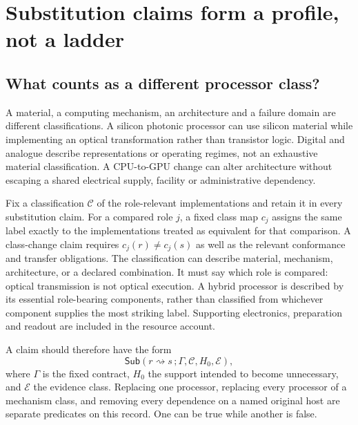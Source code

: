 \section{Substitution claims form a profile, not a ladder}\label{sec:substitution}
\subsection{What counts as a different processor class?}
A material, a computing mechanism, an architecture and a failure domain are different classifications. A silicon photonic processor can use silicon material while implementing an optical transformation rather than transistor logic. Digital and analogue describe representations or operating regimes, not an exhaustive material classification. A CPU-to-GPU change can alter architecture without escaping a shared electrical supply, facility or administrative dependency.

Fix a classification $\mathcal C$ of the role-relevant implementations and retain it in every substitution claim. For a compared role $j$, a fixed class map $c_j$ assigns the same label exactly to the implementations treated as equivalent for that comparison. A class-change claim requires $c_j(r)\ne c_j(s)$ as well as the relevant conformance and transfer obligations. The classification can describe material, mechanism, architecture, or a declared combination. It must say which role is compared: optical transmission is not optical execution. A hybrid processor is described by its essential role-bearing components, rather than classified from whichever component supplies the most striking label. Supporting electronics, preparation and readout are included in the resource account.

A claim should therefore have the form
\begin{equation}\label{eq:profile3}
 \mathsf{Sub}(r\rightsquigarrow s\,;\Gamma,\mathcal C,H_0,\mathcal E),
\end{equation}
where $\Gamma$ is the fixed contract, $H_0$ the support intended to become unnecessary, and $\mathcal E$ the evidence class. Replacing one processor, replacing every processor of a mechanism class, and removing every dependence on a named original host are separate predicates on this record. One can be true while another is false.

